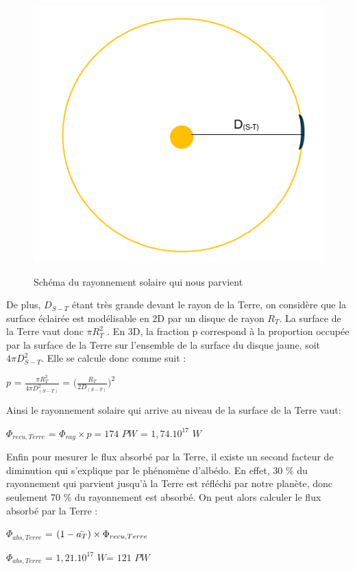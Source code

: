\documentclass[a4paper, 12pt]{report} %
\newcommand{\figcaptionwithsource}[3]{\caption[#1 
            \newline #2]{#1} \addtocontents{lof}{\protect\vspace{1\baselineskip}}}
\begin{document}
\begin{figure}[h]
    \begin{center}
    \includegraphics[scale=0.6]{Images/schemadistance.png}
    \figcaptionwithsource{Schéma du rayonnement solaire qui nous parvient}{\textit{Biorender}}{fig:figure1}
    \label{fig:figure1}
    \end{center} 
\end{figure}

De plus, $ D_{S-T}$ étant très grande devant le rayon de la Terre, on considère que la surface éclairée est modélisable en 2D par un disque de rayon $R_{T}$. La surface de la Terre vaut donc $\pi R_T^2$ . En 3D, la fraction p correspond à la proportion occupée par la surface de la Terre sur l'ensemble de la surface du disque jaune, soit $4\pi D_{S-T}^2$. Elle se calcule donc comme suit :

\begin{center}
$p$ = $\frac{\pi R_T^{2}}{4 \pi D_{(S-T)}^{2}}$ 
= $\Big( \frac{R_T}{2D_{(S-T)}} \Big)^2$ 
\end{center}

Ainsi le rayonnement solaire qui arrive au niveau de la surface de la Terre vaut: 

\begin{center}
$\Phi_{recu, Terre}$ = $\Phi_{ray} \times p = 174$ $PW$ = $1,74.10^{17}$ $W$   
\end{center}

\vspace{\baselineskip}

Enfin pour mesurer le flux absorbé par la Terre, il existe un second facteur de diminution qui s’explique par le phénomène d’albédo. En effet, 30 \% du rayonnement qui parvient jusqu’à la Terre est réfléchi par notre planète, donc seulement 70 \% du rayonnement est absorbé. 
\newline On peut alors calculer le flux absorbé par la Terre : 
\begin{center}
$\Phi_{abs,Terre}$ = $(1-\Bar{a_T}) \times \Phi_{recu, Terre}$    
\end{center}
\begin{center}
$\Phi_{abs,Terre}$ = $1,21.10^{17}$ $W$= $121$ $PW$  

\end{center}
\end{document}
